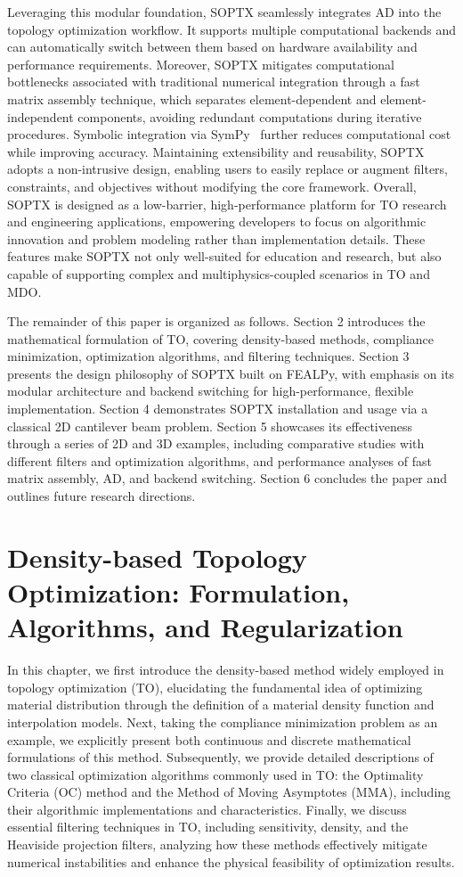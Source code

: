 \documentclass[mathpazo]{cicp}
\begin{document}
Leveraging this modular foundation, SOPTX seamlessly integrates AD into the topology optimization workflow. It supports multiple computational backends and can automatically switch between them based on hardware availability and performance requirements. Moreover, SOPTX mitigates computational bottlenecks associated with traditional numerical integration through a fast matrix assembly technique, which separates element-dependent and element-independent components, avoiding redundant computations during iterative procedures. Symbolic integration via SymPy~\cite{unknown} further reduces computational cost while improving accuracy. Maintaining extensibility and reusability, SOPTX adopts a non-intrusive design, enabling users to easily replace or augment filters, constraints, and objectives without modifying the core framework. Overall, SOPTX is designed as a low-barrier, high-performance platform for TO research and engineering applications, empowering developers to focus on algorithmic innovation and problem modeling rather than implementation details. These features make SOPTX not only well-suited for education and research, but also capable of supporting complex and multiphysics-coupled scenarios in TO and MDO.

The remainder of this paper is organized as follows. Section 2 introduces the mathematical formulation of TO, covering density-based methods, compliance minimization, optimization algorithms, and filtering techniques. Section 3 presents the design philosophy of SOPTX built on FEALPy, with emphasis on its modular architecture and backend switching for high-performance, flexible implementation. Section 4 demonstrates SOPTX installation and usage via a classical 2D cantilever beam problem. Section 5 showcases its effectiveness through a series of 2D and 3D examples, including comparative studies with different filters and optimization algorithms, and performance analyses of fast matrix assembly, AD, and backend switching. Section 6 concludes the paper and outlines future research directions.

\section{Density-based Topology Optimization: Formulation, Algorithms, and Regularization}\label{sec:math}
In this chapter, we first introduce the density-based method widely employed in topology optimization (TO), elucidating the fundamental idea of optimizing material distribution through the definition of a material density function and interpolation models. Next, taking the compliance minimization problem as an example, we explicitly present both continuous and discrete mathematical formulations of this method. Subsequently, we provide detailed descriptions of two classical optimization algorithms commonly used in TO: the Optimality Criteria (OC) method and the Method of Moving Asymptotes (MMA), including their algorithmic implementations and characteristics. Finally, we discuss essential filtering techniques in TO, including sensitivity, density, and the Heaviside projection filters, analyzing how these methods effectively mitigate numerical instabilities and enhance the physical feasibility of optimization results.
\end{document}
